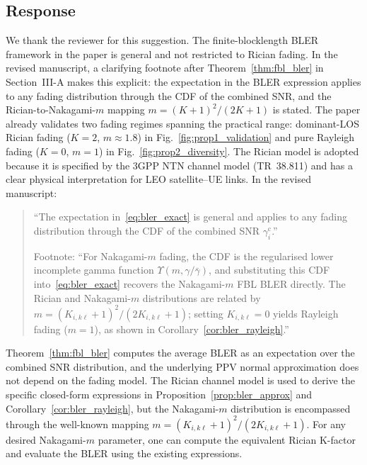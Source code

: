 \subsection{Response}

We thank the reviewer for this suggestion. The finite-blocklength BLER framework in the paper is general and not restricted to Rician fading. In the revised manuscript, a clarifying footnote after Theorem~\ref{thm:fbl_bler} in Section~III-A makes this explicit: the expectation in the BLER expression applies to any fading distribution through the CDF of the combined SNR, and the Rician-to-Nakagami-$m$ mapping $m = (K+1)^2/(2K+1)$ is stated. The paper already validates two fading regimes spanning the practical range: dominant-LOS Rician fading ($K = 2$, $m \approx 1.8$) in Fig.~\ref{fig:prop1_validation} and pure Rayleigh fading ($K = 0$, $m = 1$) in Fig.~\ref{fig:prop2_diversity}. The Rician model is adopted because it is specified by the 3GPP NTN channel model (TR~38.811) and has a clear physical interpretation for LEO satellite--UE links. In the revised manuscript:

\begin{quote}
``{\color{blue}The expectation in~\eqref{eq:bler_exact} is general and applies to any fading distribution through the CDF of the combined SNR $\gamma_i^{\mathrm{c}}$.}''

Footnote: ``{\color{blue}For Nakagami-$m$ fading, the CDF is the regularised lower incomplete gamma function $\Upsilon(m, \gamma/\bar{\gamma})$, and substituting this CDF into~\eqref{eq:bler_exact} recovers the Nakagami-$m$ FBL BLER directly. The Rician and Nakagami-$m$ distributions are related by $m = (K_{i,k\ell}+1)^2/(2K_{i,k\ell}+1)$; setting $K_{i,k\ell} = 0$ yields Rayleigh fading ($m = 1$), as shown in Corollary~\ref{cor:bler_rayleigh}.}''
\end{quote}

Theorem~\ref{thm:fbl_bler} computes the average BLER as an expectation over the combined SNR distribution, and the underlying PPV normal approximation does not depend on the fading model. The Rician channel model is used to derive the specific closed-form expressions in Proposition~\ref{prop:bler_approx} and Corollary~\ref{cor:bler_rayleigh}, but the Nakagami-$m$ distribution is encompassed through the well-known mapping $m = (K_{i,k\ell}+1)^2/(2K_{i,k\ell}+1)$. For any desired Nakagami-$m$ parameter, one can compute the equivalent Rician K-factor and evaluate the BLER using the existing expressions.

